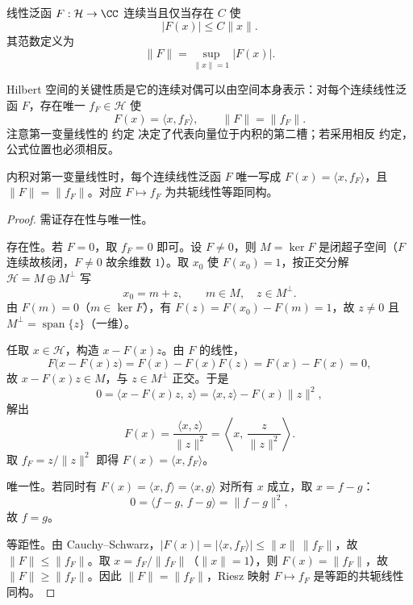 \begin{definition}[连续线性泛函]
线性泛函 $F:\mathcal H\to\CC$ 连续当且仅当存在 $C$ 使
\[
|F(x)|\le C\|x\|.
\]
其范数定义为
\[
\|F\|=\sup_{\|x\|=1}|F(x)|.
\]
\end{definition}

\begin{theorem}[Riesz 表示]
Hilbert 空间的关键性质是它的连续对偶可以由空间本身表示：对每个连续线性泛函 $F$，存在唯一 $f_F\in\mathcal H$ 使
\[
{F(x)=\langle x,f_F\rangle},
\qquad
\|F\|=\|f_F\|.
\]
注意第一变量线性的 约定 决定了代表向量位于内积的第二槽；若采用相反 约定，公式位置也必须相反。
\end{theorem}

\begin{theorem}
内积对第一变量线性时，每个连续线性泛函 $F$ 唯一写成 $F(x)=\langle x,f_F\rangle$，且 $\|F\|=\|f_F\|$。对应 $F\mapsto f_F$ 为共轭线性等距同构。
\end{theorem}
\begin{proof}
需证存在性与唯一性。

存在性。若 $F=0$，取 $f_F=0$ 即可。设 $F\neq0$，则 $M=\ker F$ 是闭超子空间（$F$ 连续故核闭，$F\neq0$ 故余维数 $1$）。取 $x_0$ 使 $F(x_0)=1$，按正交分解 $\mathcal H=M\oplus M^\perp$ 写
\begin{equation*}
 x_0=m+z,
 \qquad m\in M,\quad z\in M^\perp.
\end{equation*}
由 $F(m)=0$（$m\in\ker F$），有 $F(z)=F(x_0)-F(m)=1$，故 $z\neq0$ 且 $M^\perp=\operatorname{span}\{z\}$（一维）。

任取 $x\in\mathcal H$，构造 $x-F(x)z$。由 $F$ 的线性，
\begin{equation*}
 F\bigl(x-F(x)z\bigr)=F(x)-F(x)F(z)=F(x)-F(x)=0,
\end{equation*}
故 $x-F(x)z\in M$，与 $z\in M^\perp$ 正交。于是
\begin{equation*}
 0=\langle x-F(x)z,\,z\rangle
 =\langle x,z\rangle-F(x)\|z\|^2,
\end{equation*}
解出
\begin{equation*}
 F(x)=\frac{\langle x,z\rangle}{\|z\|^2}
 =\left\langle x,\,\frac{z}{\|z\|^2}\right\rangle.
\end{equation*}
取 $f_F=z/\|z\|^2$ 即得 $F(x)=\langle x,f_F\rangle$。

唯一性。若同时有 $F(x)=\langle x,f\rangle=\langle x,g\rangle$ 对所有 $x$ 成立，取 $x=f-g$：
\begin{equation*}
 0=\langle f-g,\,f-g\rangle=\|f-g\|^2,
\end{equation*}
故 $f=g$。

等距性。由 Cauchy--Schwarz，$|F(x)|=|\langle x,f_F\rangle|\le\|x\|\,\|f_F\|$，故 $\|F\|\le\|f_F\|$。取 $x=f_F/\|f_F\|$（$\|x\|=1$），则 $F(x)=\|f_F\|$，故 $\|F\|\ge\|f_F\|$。因此 $\|F\|=\|f_F\|$，Riesz 映射 $F\mapsto f_F$ 是等距的共轭线性同构。
\end{proof}


